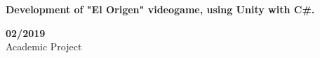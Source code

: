 \begin{minipage}{0.8\textwidth}
    \parbox{0.8\linewidth}{\textbf{Development of "El Origen" videogame, using Unity with C\#.}} \hfill \textbf{02/2019}\\
    Academic Project\\
    \end{minipage} \\